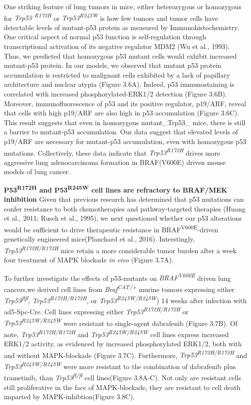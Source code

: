 One striking feature of lung tumors in mice, either heterozygous or homozygous for \emph{Trp53 \textsuperscript{R172H}} or \emph{Trp53\textsuperscript{R245W}} is how few tumors and tumor cells have detectable levels of mutant-p53 protein as measured by Immunohistochemistry. One critical aspect of normal p53 function is self-regulation through transcriptional activation of its negative regulator MDM2 (Wu et al., 1993). Thus, we predicted that homozygous p53 mutant cells would exhibit increased mutant-p53 protein. In our models, we observed that mutant p53 protein accumulation is restricted to malignant cells exhibited by a lack of papillary architecture and nuclear atypia (Figure 3.6A). Indeed, p53 immunostaining is correlated with increased phosphorylated-ERK1/2 detection (Figure 3.6B).
Moreover, immunofluorescence of p53 and its positive regulator, p19/ARF, reveal that cells with high p19/ARF are also high in p53 accumulation (Figure 3.6C). This result suggests that even in homozygous mutant\_Trp53\_ mice, there is still a barrier to mutant-p53 accumulation. Our data suggest that elevated levels of p19/ARF are necessary for mutant-p53 accumulation, even with homozygous p53 mutations. Collectively, these data indicate that \emph{Trp53\textsuperscript{R172H}} drives more aggressive lung adenocarcinoma formation in BRAF(V600E) driven mouse models of lung cancer.

\textbf{P53\textsuperscript{R172H} and P53\textsuperscript{R245W} cell lines are refractory to BRAF/MEK inhibition}
Given that previous research has determined that p53 mutations can confer resistance to both chemotherapies and pathway-targeted therapies (Huang et al., 2011; Rusch et al., 1995), we next questioned whether our p53 alterations would be sufficient to drive therapeutic resistance in BRAF\textsuperscript{V600E}-driven genetically engineered mice(Planchard et al., 2016). Interstingly, \emph{Trp53\textsuperscript{R172H/R172H}} mice retain a more considerable tumor burden after a week four treatment of MAPK blockade \emph{in vivo} (Figure 3.7A).

To further investigate the effects of p53-mutants on \emph{BRAF\textsuperscript{V600E}} driven lung cancers,we derived cell lines from \emph{Braf\textsuperscript{CAT/+}} murine tumors expressing either \emph{Trp53\textsuperscript{flfl}}, \emph{Trp53\textsuperscript{R172H/R172H}}, or \emph{Trp53\textsuperscript{R245W/R245W}}) 14 weeks after infection with ad5-Spc-Cre. Cell lines expressing either \emph{Trp53\textsuperscript{R172H/R172H}} or \emph{Trp53\textsuperscript{R245W/R245W}} were resistant to single-agent dabrafenib (Figure 3.7B). Of note, \emph{Trp53\textsuperscript{R172H/R172H}} and \emph{Trp53\textsuperscript{R245W/R245W}} cell lines express increased ERK1/2 activity, as evidenced by increased phosphorylated ERK1/2, both with and without MAPK-blockade (Figure 3.7C). Furthermore, \emph{Trp53\textsuperscript{R172H/R172H}} and \emph{Trp53\textsuperscript{R245W/R245W}} were more resistant to the combination of dabrafenib plus trametinib, than \emph{Trp53\textsuperscript{fl/fl}} cell lines(Figure 3.8A-C). Not only are resistant cells still proliferative in the face of MAPK-blockade, they are resistant to cell death imparted by MAPK-inhibtion(Figure 3.8C).

